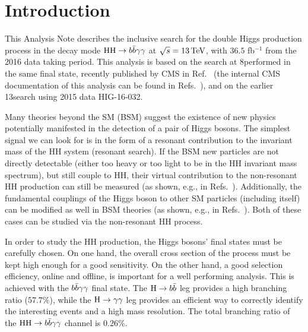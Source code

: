 \section{Introduction}
This Analysis Note describes the inclusive search for the double Higgs production process in the decay
mode $\mathrm{H}\mathrm{H} \to b\bar{b}\gamma\gamma $ at $\sqrt{s}=13\,\text{Te\hspace{-.08em}V}$, with $36.5$ fb$^{-1}$ from the 2016 data taking period. 
This analysis is based on the search at 8\TeV performed in the same final state, recently published by CMS in
Ref.~\cite{HIG-13-032} (the internal CMS documentation of this analysis can be found in Refs.~\cite{AN-13-075,AN-14-118}), and 
on the earlier 13\TeV search using 2015 data HIG-16-032.

Many theories beyond the SM (BSM) suggest the existence of new physics potentially manifested in the detection of a pair of Higgs bosons. 
The simplest signal we can look for is in the form of a resonant contribution to the invariant mass of the HH system (resonant search). 
If the BSM new particles are not directly detectable (either too heavy or too light to be in the HH invariant mass spectrum), but still couple to HH, their virtual contribution to the non-resonant HH production can still be measured (as shown, e.g., in Refs.~\cite{Dawson:2015oha,Cao:2013si}). Additionally, the fundamental couplings of the Higgs boson to other SM particles (including itself) can be modified as well in BSM theories (as shown, e.g., in Refs.~\cite{Mangano:2002ea,Grober:2015cwa}). Both of these cases can be studied via the non-resonant HH process.

In order to study the HH production, the Higgs bosons' final states must be carefully chosen. On one hand, the overall cross section of the process must be kept high enough for a good sensitivity. On the other hand, a good selection efficiency, online and offline, is important for a well performing analysis. This is achieved with the $b\bar{b}\gamma\gamma $ final state. The $\mathrm{H}\to b\bar{b}$ leg provides a high branching ratio ($57.7\%$), while the $\mathrm{H}\to\gamma\gamma$ leg provides an efficient way to correctly identify the interesting events and a high mass resolution. The total branching ratio of the $\mathrm{H}\mathrm{H}\to b\bar{b}\gamma\gamma $  channel is $0.26\%$.


